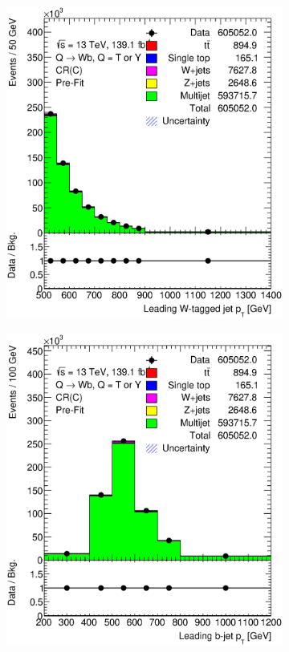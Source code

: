 \begin{figure}[hbt!]
	\centering
	\graphicspath{{figs/appendix/CRC/}}
	\begin{subfigure}{.35\textwidth}
		\centering
		\includegraphics[width=\linewidth,height=\textheight,keepaspectratio]{CR_C_ljet_pt.eps}
		\caption{}
		\label{fig:app:cr_c:ljet_pt}
	\end{subfigure}\hspace{0.6cm}
	\begin{subfigure}{.35\textwidth}
		\centering
		\includegraphics[width=\linewidth,height=\textheight,keepaspectratio]{CR_C_jet_pt.eps}

\end{subfigure}
\end{figure}
